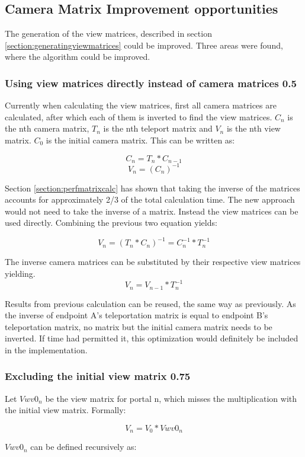 \subsection{Camera Matrix Improvement opportunities}
The generation of the view matrices, described in section \ref{section:generatingviewmatrices} could be improved. Three areas were found, where the algorithm could be improved.

\subsubsection{Using view matrices directly instead of camera matrices 0.5}
Currently when calculating the view matrices, first all camera matrices are calculated, after which each of them is inverted to find the view matrices. $C_n$ is the nth camera matrix, $T_n$ is the nth teleport matrix and $V_n$ is the nth view matrix. $C_0$ is the initial camera matrix. This can be written as:

$$C_n = T_{n} * C_{n-1}$$
$$V_n = (C_{n})^{-1}$$

Section \ref{section:perfmatrixcalc} has shown that taking the inverse of the matrices accounts for approximately 2/3 of the total calculation time. The new approach would not need to take the inverse of a matrix. Instead the view matrices can be used directly.
Combining the previous two equation yields:

$$V_n = (T_n * C_n)^{-1} = C_n^{-1} * T_n^{-1}$$

The inverse camera matrices can be substituted by their respective view matrices yielding.
$$V_n = V_{n-1} * T_n^{-1}$$

Results from previous calculation can be reused, the same way as previously. As the inverse of \gls{endpoint} A's teleportation matrix is equal to \gls{endpoint} B's teleportation matrix, no matrix but the initial camera matrix needs to be inverted. If time had permitted it, this optimization would definitely be included in the implementation.

\subsubsection{Excluding the initial view matrix 0.75}
\label{section:noveiw}
Let $Vwv0_n$ be the view matrix for portal n, which misses the multiplication with the initial view matrix. Formally:

$$V_n = V_0 * Vwv0_n$$

$Vwv0_n$ can be defined recursively as:

